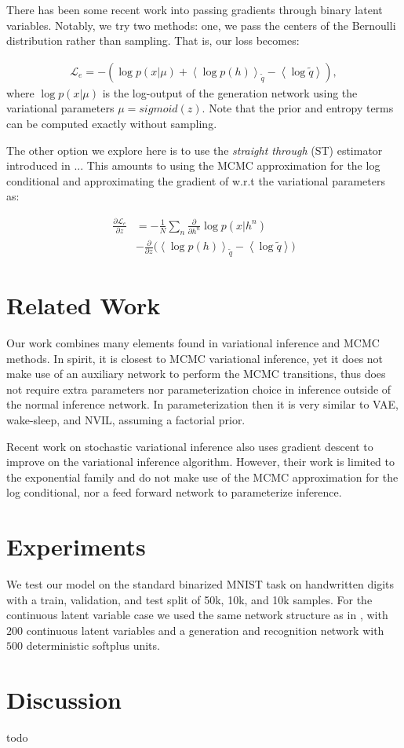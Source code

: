 \documentclass[preprint, twocolumn]{article}
\newcommand{\qexp}[1]{\left<#1\right>}
\newcommand{\LL}[0]{\mathcal{L}}
\begin{document}
There has been some recent work into passing gradients through binary latent variables. Notably, we try two methods: one, we pass the centers of the Bernoulli distribution rather than sampling. That is, our loss becomes:

\begin{align}
	 \LL_e = -(\log p(x | \mu) + \qexp{\log p(h)}_{\tilde{q}} - \qexp{\log \tilde{q}}),
\end{align}
where $\log p(x | \mu)$ is the log-output of the generation network using the variational parameters $\mu = sigmoid(z)$. Note that the prior and entropy terms can be computed exactly without sampling.

The other option we explore here is to use the \emph{straight through} (ST) \cite{bengio2013estimating} estimator introduced in ... This amounts to using the MCMC approximation for the log conditional and approximating the gradient of w.r.t the variational parameters as:

\begin{align}
	\frac{\partial \LL_e}{\partial z} &=  -\frac{1}{N} \sum_n \frac{\partial}{\partial h^n} \log p(x|h^n) \nonumber \\
	&- \frac{\partial}{\partial z} \big( \qexp{\log p(h)}_{\tilde{q}} - \qexp{\log \tilde{q}} \big) 
\end{align}

\section{Related Work}
Our work combines many elements found in variational inference and MCMC methods. In spirit, it is closest to MCMC variational inference, yet it does not make use of an auxiliary network to perform the MCMC transitions, thus does not require extra parameters nor parameterization choice in inference outside of the normal inference network. In parameterization then it is very similar to VAE, wake-sleep, and NVIL, assuming a factorial prior.

Recent work on stochastic variational inference \cite{hoffman2013stochastic} also uses gradient descent to improve on the variational inference algorithm. However, their work is limited to the exponential family and do not make use of the MCMC approximation for the log conditional, nor a feed forward network to parameterize inference.

\section{Experiments}
We test our model on the standard binarized MNIST task on handwritten digits with a train, validation, and test split of 50k, 10k, and 10k samples. For the continuous latent variable case we used the same network structure as in \cite{kingma2013auto, salimans2014markov}, with $200$ continuous latent variables and a generation and recognition network with $500$ deterministic softplus units.
\section{Discussion}
todo



\end{document}
